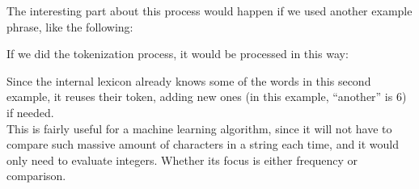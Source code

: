 The interesting part about this process would happen if we used another example phrase, like the following:
\begin{center}
\end{center}

If we did the tokenization process, it would be processed in this way:
\begin{center}
\end{center}

Since the internal lexicon already knows some of the words in this second example, it reuses their token, adding new ones (in this example, ``another'' is 6) if needed.\\

This is fairly useful for a machine learning algorithm, since it will not have to compare such massive amount of characters in a string each time, and it would only need to evaluate integers. Whether its focus is either frequency or comparison.

\clearpage